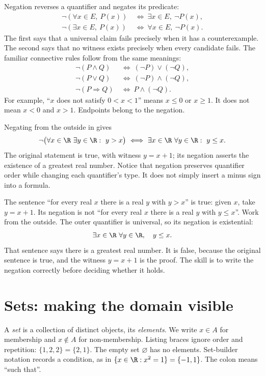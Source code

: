 Negation reverses a quantifier and negates its predicate:
\[
\begin{aligned}
\neg(\forall x\in E,\ P(x))&\ \Longleftrightarrow\
\exists x\in E,\ \neg P(x),\\
\neg(\exists x\in E,\ P(x))&\ \Longleftrightarrow\
\forall x\in E,\ \neg P(x).
\end{aligned}
\]
The first says that a universal claim fails precisely when it has a counterexample.
The second says that no witness exists precisely when every candidate fails.
The familiar connective rules follow from the same meanings:
\[
\begin{aligned}
\neg(P\land Q)&\ \Longleftrightarrow\ (\neg P)\lor(\neg Q),\\
\neg(P\lor Q)&\ \Longleftrightarrow\ (\neg P)\land(\neg Q),\\
\neg(P\Rightarrow Q)&\ \Longleftrightarrow\ P\land(\neg Q).
\end{aligned}
\]
For example, ``$x$ does not satisfy $0<x<1$'' means $x\le0$ or $x\ge1$.
It does not mean $x<0$ and $x>1$. Endpoints belong to the negation.

Negating from the outside in gives
\[
\neg\bigl(\forall x\in\R\ \exists y\in\R:\ y>x\bigr)
\ \Longleftrightarrow\
\exists x\in\R\ \forall y\in\R:\ y\le x.
\]
The original statement is true, with witness $y=x+1$; its negation asserts the
existence of a greatest real number. Notice that negation preserves quantifier order
while changing each quantifier's type. It does not simply insert a minus sign into a formula.

\begin{examplex}[negating a definition, not a formula]
The sentence ``for every real $x$ there is a real $y$ with $y>x$'' is true: given $x$,
take $y=x+1$. Its negation is not ``for every real $x$ there is a real $y$ with $y\le x$''.
Work from the outside. The outer quantifier is universal, so its negation is existential:
\[
\exists x\in\R\ \forall y\in\R,\quad y\le x.
\]
That sentence says there is a greatest real number. It is false, because the original
sentence is true, and the witness $y=x+1$ is the proof. The skill is to write the
negation correctly before deciding whether it holds.
\end{examplex}

\section{Sets: making the domain visible}

A \emph{set} is a collection of distinct objects, its \emph{elements}. We write $x\in A$
for membership and $x\notin A$ for non-membership. Listing braces ignore order and
repetition: $\{1,2,2\}=\{2,1\}$. The empty set $\varnothing$ has no elements.
Set-builder notation records a condition, as in
$\{x\in\R:x^2=1\}=\{-1,1\}$. The colon means ``such that''.

